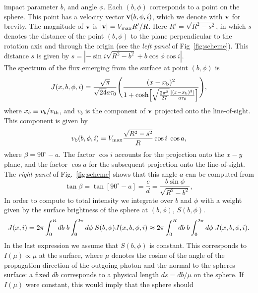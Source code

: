 impact parameter $b$, and angle $\phi$.
Each $(b,\phi)$ corresponds to a point on the sphere.
This point has a velocity vector ${\bf v}(b,\phi,i)$, which we denote
with ${\bf v}$ for brevity. The magnitude of ${\bf v}$ is $|{\bf v}|=V_{\rm max}R'/R$. Here $R'=\sqrt{R^2 -s^2}$, in which $s$ denotes the distance of the point $(b,\phi)$ to the plane perpendicular to the rotation axis and through the origin (see the {\it left panel} of Fig~\ref{fig:scheme}). This distance $s$ is given by $s=|-\sin i\sqrt{R^2-b^2}+ b \cos \phi \cos i|$.\\
The spectrum of the flux emerging from the surface at point $(b,\phi)$ is
\begin{displaymath}
J(x,b,\phi,i)=\frac{\sqrt{\pi}}{\sqrt{24}a\tau_0}\Bigg{(}\frac{(x-x_{\rm
b})^2}{1+{\rm cosh}\Big{[}\sqrt{\frac{2\pi^3}{27}}\frac{|(x
-x_{\rm b})^3|}{a\tau_0}\Big{]}}\Bigg{)},
\end{displaymath}
%
where $x_b\equiv v_{b}/v_{\rm th}$, and $v_b$ is the component of ${\bf v}$ projected onto the line-of-sight. This component is given by
\begin{equation}
v_{\rm b}(b,\phi,i)=V_{\rm max}\frac{\sqrt{R^2 -s^2}}{R}\cos i {\hspace{1mm}}
\cos a,
\end{equation}
where $\beta = 90^{\circ}-a$. The factor $\cos i$ accounts for the projection onto the $x-y$ plane, and the factor $\cos a$ for the subsequent projection onto the line-of-sight. The {\it right panel} of Fig.~\ref{fig:scheme} shows that this angle $a$ can be computed from
%
\begin{equation}
\tan \beta =\tan[90^{\circ}-a]=\frac{c}{d}=\frac{ b\sin \phi}{\sqrt{R^2 -b^2}},
\end{equation}
%
In order to compute to total intensity we integrate over $b$ and
$\phi$ with a weight given by the surface brightness of the
sphere at $(b,\phi)$, $S(b,\phi)$.
\begin{displaymath}
J(x,i)=2\pi \int_0^Rdb {\hspace{1mm}} b \int_0^{2\pi}d\phi {\hspace{1mm}}
S(b,\phi)J(x,b,\phi,i) \approx 2\pi \int_0^Rdb {\hspace{1mm}} b
\int_0^{2\pi}d\phi {\hspace{1mm}} J(x,b,\phi,i)\\ \nonumber.
\end{displaymath}
%
In the last expression we assume that $S(b,\phi)$ is constant.
This corresponds to $I(\mu) \propto \mu$ at the surface, where $\mu$
denotes the cosine of the angle of the propagation direction of the
outgoing photon and the normal to the spheres surface: a fixed $db$
corresponds to a physical length $ds = db/\mu$ on the sphere.
If $I(\mu)$ were constant, this would imply that the sphere should
